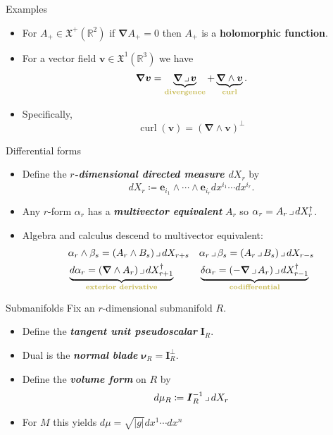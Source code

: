 \documentclass[aspectratio=169,handout]{beamer}
\newcommand\boldgreen[1]{\textcolor{lighter_csu_green}{\emph{\textbf{#1}}}}
\newcommand\boldgold[1]{\textcolor{csu_gold}{\textbf{#1}}}
\newcommand{\R}{\mathbb{R}}
\newcommand{\grad}{\boldsymbol{\nabla}}
\newcommand{\blade}[1]{\boldsymbol{#1}}
\newcommand{\normal}{\blade{\nu}}
\newcommand{\pseudoscalar}{\blade{I}}
\newcommand{\contract}{\hspace*{.5mm} \lrcorner \hspace*{.5mm}}
\newcommand{\smoothfields}{\mathfrak{X}}
\begin{document}
\begin{frame}{Examples}
\vfill
\begin{itemize}
\pause
\item For $A_+ \in \smoothfields^+(\R^2)$ if $\grad A_+=0$ then $A_+$ is a \boldgold{holomorphic function}.
\pause
\item For a vector field $\blade{v}\in \smoothfields^1(\R^3)$ we have
    \[
    \grad \blade{v} = \underbrace{\grad \contract \blade{v}}_{\textrm{\boldgold{divergence}}} + \underbrace{\grad \wedge \blade{v}}_{\textrm{\boldgold{curl}}}.
    \]
\pause
\item Specifically,
\[
    \operatorname{curl}(\blade{v}) = (\grad \wedge \blade{v})^\perp
\]
\end{itemize}
\vfill
\end{frame}

\begin{frame}{Differential forms}
\vfill
\begin{itemize}
    \pause
    \item Define the \boldgreen{$r$-dimensional directed measure $dX_r$} by
    \[
    dX_r\coloneqq \blade{e}_{i_1} \wedge \cdots \wedge \blade{e}_{i_r} dx^{i_1} \cdots dx^{i_r}.
    \]
    \pause
    \item Any $r$-form $\alpha_r$ has a \boldgreen{multivector equivalent} $A_r$ so $\alpha_r = A_r \contract dX_r^\dagger$.
    \pause
    \item Algebra and calculus descend to multivector equivalent:
    \begin{align*}
    &\alpha_r \wedge \beta_s = (A_r \wedge B_s) \contract dX_{r+s} & &\alpha_r \contract \beta_s = (A_r \contract B_s) \contract dX_{r-s} \\
  &\underbrace{d\alpha_r = (\grad \wedge A_r) \contract dX_{r+1}^\dagger}_{\textrm{\boldgold{exterior derivative}}} & &\underbrace{\delta \alpha_r = (-\grad \contract A_r) \contract dX_{r-1}^\dagger}_{\textrm{\boldgold{codifferential}}}
    \end{align*}
\end{itemize}
\vfill
\end{frame}

\begin{frame}{Submanifolds}
\vfill
Fix an $r$-dimensional submanifold $R$.
\begin{itemize}
    \pause
    \item Define the \boldgreen{tangent unit pseudoscalar} $\pseudoscalar_R$.
    \pause
    \item Dual is the \boldgreen{normal blade} $\normal_R = \pseudoscalar_R^\perp$.
    \pause
    \item Define the \boldgreen{volume form} on $R$ by
    \[
    d\mu_R \coloneqq \pseudoscalar^{-1}_R \contract dX_r
    \]
    \pause
    \item For $M$ this yields $d\mu = \sqrt{|g|}dx^1\cdots dx^n$
\end{itemize}
\vfill
\end{frame}
\end{document}
